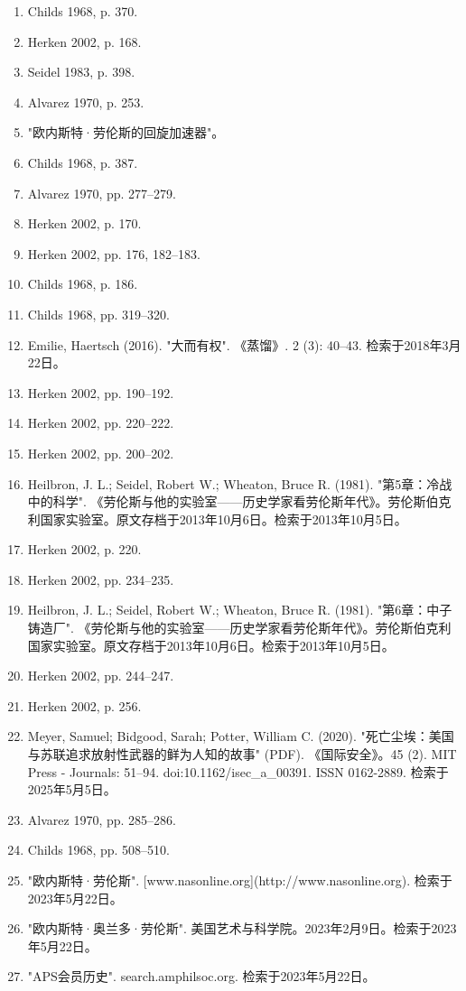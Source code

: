 \begin{enumerate}
\item Childs 1968, p. 370.
\item Herken 2002, p. 168.
\item Seidel 1983, p. 398.
\item Alvarez 1970, p. 253.
\item "欧内斯特·劳伦斯的回旋加速器"。
\item Childs 1968, p. 387.
\item Alvarez 1970, pp. 277–279.
\item Herken 2002, p. 170.
\item Herken 2002, pp. 176, 182–183.
\item Childs 1968, p. 186.
\item Childs 1968, pp. 319–320.
\item Emilie, Haertsch (2016). "大而有权". 《蒸馏》. 2 (3): 40–43. 检索于2018年3月22日。
\item Herken 2002, pp. 190–192.
\item Herken 2002, pp. 220–222.
\item Herken 2002, pp. 200–202.
\item Heilbron, J. L.; Seidel, Robert W.; Wheaton, Bruce R. (1981). "第5章：冷战中的科学". 《劳伦斯与他的实验室——历史学家看劳伦斯年代》。劳伦斯伯克利国家实验室。原文存档于2013年10月6日。检索于2013年10月5日。
\item Herken 2002, p. 220.
\item Herken 2002, pp. 234–235.
\item Heilbron, J. L.; Seidel, Robert W.; Wheaton, Bruce R. (1981). "第6章：中子铸造厂". 《劳伦斯与他的实验室——历史学家看劳伦斯年代》。劳伦斯伯克利国家实验室。原文存档于2013年10月6日。检索于2013年10月5日。
\item Herken 2002, pp. 244–247.
\item Herken 2002, p. 256.
\item Meyer, Samuel; Bidgood, Sarah; Potter, William C. (2020). "死亡尘埃：美国与苏联追求放射性武器的鲜为人知的故事" (PDF). 《国际安全》。45 (2). MIT Press - Journals: 51–94. doi:10.1162/isec\_a\_00391. ISSN 0162-2889. 检索于2025年5月5日。
\item Alvarez 1970, pp. 285–286.
\item Childs 1968, pp. 508–510.
\item "欧内斯特·劳伦斯". [www.nasonline.org](http://www.nasonline.org). 检索于2023年5月22日。
\item "欧内斯特·奥兰多·劳伦斯". 美国艺术与科学院。2023年2月9日。检索于2023年5月22日。
\item "APS会员历史". search.amphilsoc.org. 检索于2023年5月22日。

\end{enumerate}
